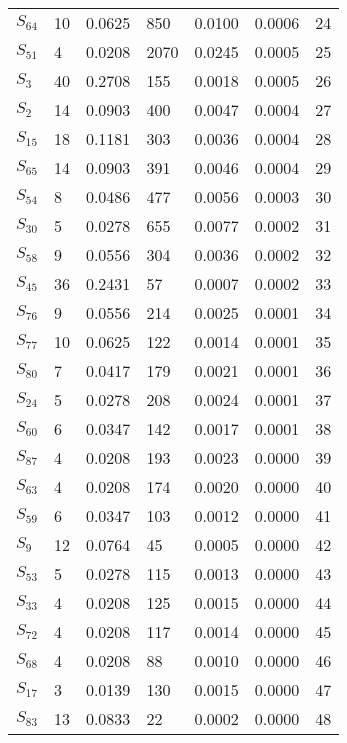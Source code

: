 \begin{xltabular}{\textwidth}{XXXXXXX}
  $S_{64}$ & 10 & 0.0625 & 850 & 0.0100 & 0.0006 & 24 \\ 
  $S_{51}$ & 4 & 0.0208 & 2070 & 0.0245 & 0.0005 & 25 \\ 
  $S_{3}$ & 40 & 0.2708 & 155 & 0.0018 & 0.0005 & 26 \\ 
  $S_{2}$ & 14 & 0.0903 & 400 & 0.0047 & 0.0004 & 27 \\ 
  $S_{15}$ & 18 & 0.1181 & 303 & 0.0036 & 0.0004 & 28 \\ 
  $S_{65}$ & 14 & 0.0903 & 391 & 0.0046 & 0.0004 & 29 \\ 
  $S_{54}$ & 8 & 0.0486 & 477 & 0.0056 & 0.0003 & 30 \\ 
  $S_{30}$ & 5 & 0.0278 & 655 & 0.0077 & 0.0002 & 31 \\ 
  $S_{58}$ & 9 & 0.0556 & 304 & 0.0036 & 0.0002 & 32 \\ 
  $S_{45}$ & 36 & 0.2431 & 57 & 0.0007 & 0.0002 & 33 \\ 
  $S_{76}$ & 9 & 0.0556 & 214 & 0.0025 & 0.0001 & 34 \\ 
  $S_{77}$ & 10 & 0.0625 & 122 & 0.0014 & 0.0001 & 35 \\ 
  $S_{80}$ & 7 & 0.0417 & 179 & 0.0021 & 0.0001 & 36 \\ 
  $S_{24}$ & 5 & 0.0278 & 208 & 0.0024 & 0.0001 & 37 \\ 
  $S_{60}$ & 6 & 0.0347 & 142 & 0.0017 & 0.0001 & 38 \\ 
  $S_{87}$ & 4 & 0.0208 & 193 & 0.0023 & 0.0000 & 39 \\ 
  $S_{63}$ & 4 & 0.0208 & 174 & 0.0020 & 0.0000 & 40 \\ 
  $S_{59}$ & 6 & 0.0347 & 103 & 0.0012 & 0.0000 & 41 \\ 
  $S_{9}$ & 12 & 0.0764 & 45 & 0.0005 & 0.0000 & 42 \\ 
  $S_{53}$ & 5 & 0.0278 & 115 & 0.0013 & 0.0000 & 43 \\ 
  $S_{33}$ & 4 & 0.0208 & 125 & 0.0015 & 0.0000 & 44 \\ 
  $S_{72}$ & 4 & 0.0208 & 117 & 0.0014 & 0.0000 & 45 \\ 
  $S_{68}$ & 4 & 0.0208 & 88 & 0.0010 & 0.0000 & 46 \\ 
  $S_{17}$ & 3 & 0.0139 & 130 & 0.0015 & 0.0000 & 47 \\ 
  $S_{83}$ & 13 & 0.0833 & 22 & 0.0002 & 0.0000 & 48 \\ 

\end{xltabular}
